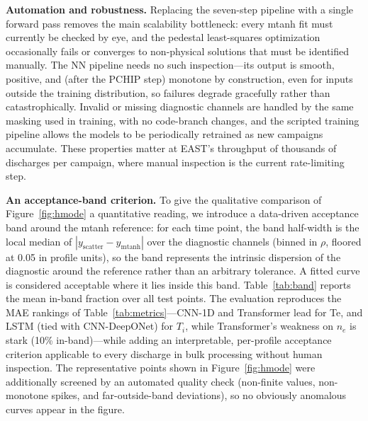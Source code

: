 \documentclass[a4paper,12pt]{article}
\begin{document}
\textbf{Automation and robustness.} Replacing the seven-step pipeline with a single forward pass removes the main scalability bottleneck: every mtanh fit must currently be checked by eye, and the pedestal least-squares optimization occasionally fails or converges to non-physical solutions that must be identified manually. The NN pipeline needs no such inspection---its output is smooth, positive, and (after the PCHIP step) monotone by construction, even for inputs outside the training distribution, so failures degrade gracefully rather than catastrophically. Invalid or missing diagnostic channels are handled by the same masking used in training, with no code-branch changes, and the scripted training pipeline allows the models to be periodically retrained as new campaigns accumulate. These properties matter at EAST's throughput of thousands of discharges per campaign, where manual inspection is the current rate-limiting step.

\textbf{An acceptance-band criterion.} To give the qualitative comparison of Figure~\ref{fig:hmode} a quantitative reading, we introduce a data-driven acceptance band around the mtanh reference: for each time point, the band half-width is the local median of $|y_{\text{scatter}} - y_{\text{mtanh}}|$ over the diagnostic channels (binned in $\rho$, floored at 0.05 in profile units), so the band represents the intrinsic dispersion of the diagnostic around the reference rather than an arbitrary tolerance. A fitted curve is considered acceptable where it lies inside this band. Table~\ref{tab:band} reports the mean in-band fraction over all test points. The evaluation reproduces the MAE rankings of Table~\ref{tab:metrics}---CNN-1D and Transformer lead for Te, and LSTM (tied with CNN-DeepONet) for $T_i$, while Transformer's weakness on $n_e$ is stark (10\% in-band)---while adding an interpretable, per-profile acceptance criterion applicable to every discharge in bulk processing without human inspection. The representative points shown in Figure~\ref{fig:hmode} were additionally screened by an automated quality check (non-finite values, non-monotone spikes, and far-outside-band deviations), so no obviously anomalous curves appear in the figure.
\end{document}
